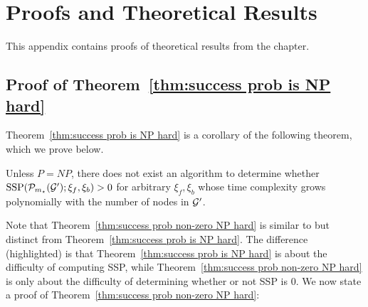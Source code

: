 \section{Proofs and Theoretical Results}\label{appendix:proofs}

This appendix contains proofs of theoretical results from the chapter.

\subsection{Proof of Theorem~\ref{thm:success prob is NP hard}}\label{appendix:proofs:succ-prob-np-hard}

Theorem~\ref{thm:success prob is NP hard} is a corollary of the following theorem,
which we prove below.

\begin{theorem}\label{thm:success prob non-zero NP hard}
    Unless $P=NP$, there does not exist an algorithm to determine
    {\color{blue}whether $\mathrm{SSP}(\mathcal{P}_{m_\star}({\mathcal{G}}') ; \xi_f, \xi_b) > 0$}
    for arbitrary $\xi_f,\xi_b$ whose time complexity grows polynomially with the number of nodes
    in ${\mathcal{G}}'$.
\end{theorem}
Note that Theorem~\ref{thm:success prob non-zero NP hard}
is similar to but distinct from Theorem~\ref{thm:success prob is NP hard}.
The difference ({\color{blue}highlighted})
is that Theorem~\ref{thm:success prob is NP hard}
is about the difficulty of computing SSP,
while Theorem~\ref{thm:success prob non-zero NP hard}
is only about the difficulty of determining whether or not SSP is 0.
We now state a proof of Theorem~\ref{thm:success prob non-zero NP hard}:
